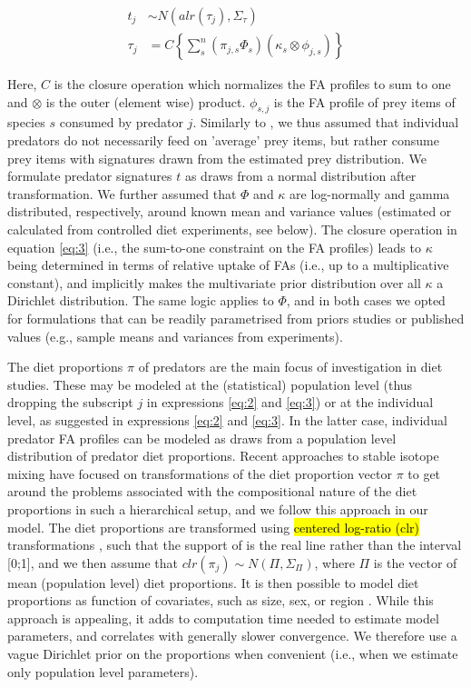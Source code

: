 \documentclass[fleqn,10pt]{wlpeerj}
\begin{document}
\begin{align}
t_j &\sim N(alr(\tau_{j}),\Sigma_{\tau})\label{eq:2}\\
\tau_{j} &= C \left\{ \sum_{s}^n  \left(\pi_{j,s} \Phi_{s} \right) \left(
    \kappa_{s} \otimes \phi_{j,s} \right) \right\}\label{eq:3}
\end{align}

Here, $C$ is the closure operation which normalizes the FA profiles to sum to
one and $\otimes$ is the outer (element wise) product. $\phi_{s,j}$ is
the FA profile of prey items of species $s$ consumed by predator
$j$. Similarly to \citet{parnell_bayesian_2012},
we thus assumed that individual predators do not necessarily feed on
'average' prey items, but rather consume prey items with
signatures drawn from the estimated prey distribution. We
formulate predator signatures $t$ as draws from a normal distribution after
transformation. We further assumed that
$\Phi$ and $\kappa$ are log-normally and gamma
distributed, respectively, around known mean and variance values (estimated or
calculated from controlled diet experiments, see below). The
closure operation in equation \eqref{eq:3} (i.e., the sum-to-one constraint
on the FA profiles) leads to $\kappa$ being determined in terms of
relative uptake of FAs (i.e., up to a multiplicative
constant), and implicitly makes the multivariate prior distribution over all $\kappa$ a Dirichlet
distribution. The same logic applies to $\Phi$, and in both cases we
opted for formulations that can be readily parametrised from priors
studies or published values (e.g., sample means and variances from experiments).

The diet proportions $\pi$ of predators are the main focus of investigation
in diet studies. These may be modeled at the (statistical) population
level (thus dropping the subscript $j$ in expressions \eqref{eq:2} and \eqref{eq:3}) or at the
individual level, as suggested in expressions \eqref{eq:2} and \eqref{eq:3}. In the latter case,
individual predator FA profiles can be modeled as draws from a population
level distribution of predator diet proportions. Recent approaches to stable
isotope mixing have focused on transformations of the diet proportion
vector $\pi$ to get around the
problems associated with the compositional nature of the diet
proportions in such a hierarchical setup, and we follow this approach
in our model. The diet proportions are transformed using \hl{centered log-ratio (clr)}
transformations \citep{semmens_quantifying_2009}, such that the
support of is the real line rather than the interval [0;1], and we
then assume that $clr(\pi_j) \sim N(\Pi,\Sigma_{\Pi})$, where $\Pi$ is the
vector of mean (population level) diet proportions. It is
then possible to model diet proportions as function of
covariates, such as size, sex, or region \citep[i.e., in a regression
formulation,][]{parnell_bayesian_2012}. While this approach is appealing, it adds to computation time needed
to estimate model parameters, and correlates with generally slower convergence. We therefore use a vague Dirichlet prior
on the proportions when convenient (i.e., when we estimate only
population level parameters).
\end{document}
